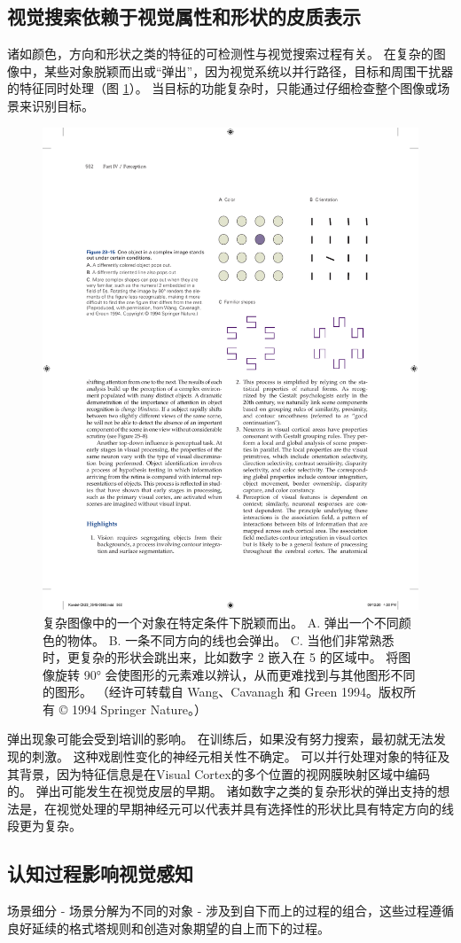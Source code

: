 \subsection{视觉搜索依赖于视觉属性和形状的皮质表示}

诸如颜色，方向和形状之类的特征的可检测性与视觉搜索过程有关。
在复杂的图像中，某些对象脱颖而出或“弹出”，因为视觉系统以并行路径，目标和周围干扰器的特征同时处理（图 \ref{fig:23_15}）。 
当目标的功能复杂时，只能通过仔细检查整个图像或场景来识别目标。

\begin{figure}[htbp]
	\centering
	\includegraphics[width=0.6\linewidth]{chap23/fig_23_15}
	\caption{复杂图像中的一个对象在特定条件下脱颖而出。 A. 弹出一个不同颜色的物体。 B. 一条不同方向的线也会弹出。 C. 当他们非常熟悉时，更复杂的形状会跳出来，比如数字 2 嵌入在 5 的区域中。 将图像旋转 90° 会使图形的元素难以辨认，从而更难找到与其他图形不同的图形。 （经许可转载自 Wang、Cavanagh 和 Green 1994。版权所有 © 1994 Springer Nature。）}
	\label{fig:23_15}
\end{figure}


弹出现象可能会受到培训的影响。
在训练后，如果没有努力搜索，最初就无法发现的刺激。 
这种戏剧性变化的神经元相关性不确定。
可以并行处理对象的特征及其背景，因为特征信息是在Visual Cortex的多个位置的视网膜映射区域中编码的。
弹出可能发生在视觉皮层的早期。
诸如数字之类的复杂形状的弹出支持的想法是，在视觉处理的早期神经元可以代表并具有选择性的形状比具有特定方向的线段更为复杂。



\subsection{认知过程影响视觉感知}
场景细分 - 场景分解为不同的对象 - 涉及到自下而上的过程的组合，这些过程遵循良好延续的格式塔规则和创造对象期望的自上而下的过程。



